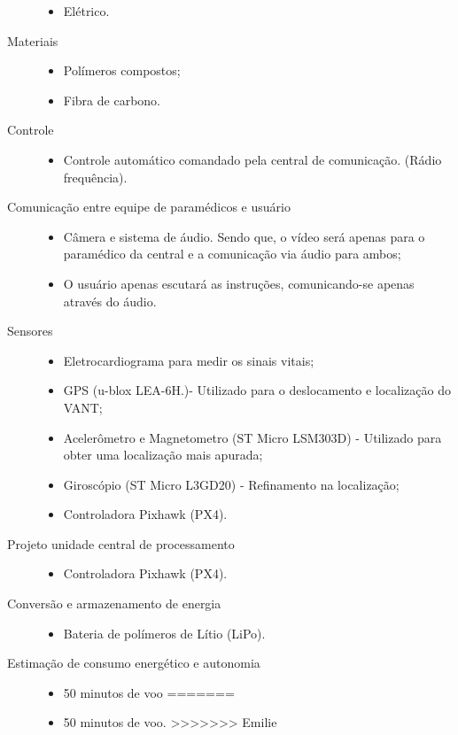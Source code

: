 \begin{description}
\begin{itemize}
		\item Elétrico.
  	\end{itemize}
  \item[Materiais] \hfill 
  	\begin{itemize}
  		\item Polímeros compostos;
		\item Fibra de carbono.
  	\end{itemize}
  \item[Controle] \hfill 
  	\begin{itemize}
  		\item Controle automático comandado pela central de comunicação. (Rádio frequência).
  	\end{itemize}
  \item[Comunicação entre equipe de paramédicos e usuário] \hfill 
  	\begin{itemize}
  		\item Câmera e sistema de áudio. Sendo que, o vídeo será apenas para o paramédico da central e a comunicação via áudio para ambos;
  		\item O usuário apenas escutará as instruções, comunicando-se apenas através do áudio.
  	\end{itemize}
  \item[Sensores] \hfill 
  	\begin{itemize}
  		\item Eletrocardiograma para medir os sinais vitais;
		\item GPS (u-blox LEA-6H.)- Utilizado para o deslocamento e localização do VANT;
		\item Acelerômetro e Magnetometro (ST Micro LSM303D) - Utilizado para obter uma localização mais apurada;
		\item Giroscópio (ST Micro L3GD20) - Refinamento na localização;
		\item Controladora Pixhawk (PX4).
  	\end{itemize}
  \item[Projeto unidade central de processamento] \hfill 
  	\begin{itemize}
  		\item Controladora Pixhawk (PX4).
  	\end{itemize}
  \item[Conversão e armazenamento de energia] \hfill 
  	\begin{itemize}
  		\item Bateria de polímeros de Lítio (LiPo).
  	\end{itemize}
  \item[Estimação de consumo energético e autonomia] \hfill 
  	\begin{itemize}
<<<<<<< HEAD
  		\item 50 minutos de voo
=======
  		\item 50 minutos de voo.
>>>>>>> Emilie
  	\end{itemize}
\end{description}

